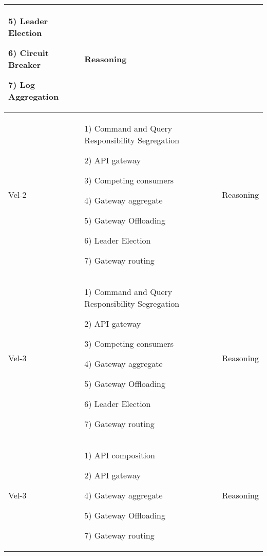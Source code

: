 \documentclass[conference]{IEEEtran}
\begin{document}
\begin{center}
\begin{table*}
\begin{tabular}{ | m{2cm} | m{8cm} |  m{2cm} |}
        5) Leader Election 

        6) Circuit Breaker 

        7) Log Aggregation  
        
        & Reasoning
        
        \\
        \hline

        Vel-2 &  
    
        1) Command and Query Responsibility Segregation
        
        2) API gateway

        3) Competing consumers

        4) Gateway aggregate

        5) Gateway Offloading

        6) Leader Election 
        
        7) Gateway routing 

        & Reasoning

        \\

        \hline

        Vel-3 &  
    
        1) Command and Query Responsibility Segregation
        
        2) API gateway

        3) Competing consumers

        4) Gateway aggregate

        5) Gateway Offloading

        6) Leader Election 
        
        7) Gateway routing 

        & Reasoning
        
        \\
        \hline

        \hline

        Vel-3 &  

        1) API composition
        
        2) API gateway

        4) Gateway aggregate

        5) Gateway Offloading
        
        7) Gateway routing 

        & Reasoning
        
        \\
        \hline


\end{tabular}
\end{table*}
\end{center}
\end{document}
